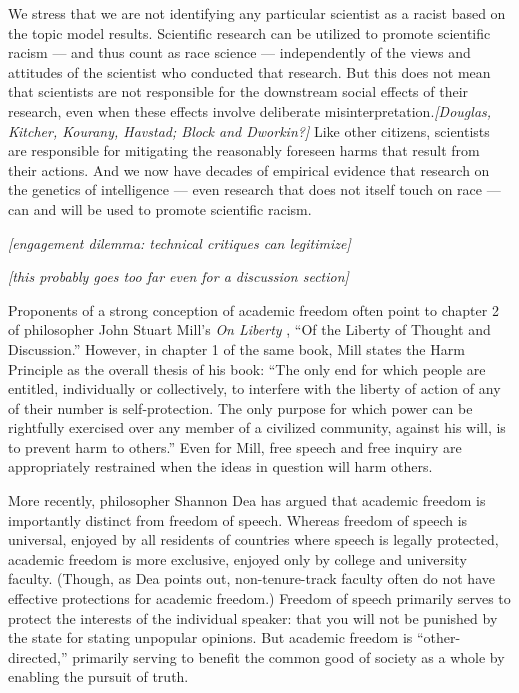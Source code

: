 \documentclass[12pt]{article}
\begin{document}
We stress that we are not identifying any particular scientist as a
racist based on the topic model results. Scientific research can be
utilized to promote scientific racism --- and thus count as race science
--- independently of the views and attitudes of the scientist who
conducted that
research.\cite{TaberyWhyStudyingGenetics2015, CarlsonQuantifyingContextualizingImpact2020, HennWhyDNANo2021}
But this does not mean that scientists are not responsible for the
downstream social effects of their research, even when these effects
involve deliberate misinterpretation.\emph{{[}Douglas, Kitcher, Kourany,
Havstad; Block and Dworkin?{]}} Like other citizens, scientists are
responsible for mitigating the reasonably foreseen harms that result
from their actions. And we now have decades of empirical evidence that
research on the genetics of intelligence --- even research that does not
itself touch on race --- can and will be used to promote scientific
racism.\cite{MeyerWrestlingSocialBehavioral2023}

\emph{{[}engagement dilemma: technical critiques can legitimize{]}}

\emph{{[}this probably goes too far even for a discussion section{]}}

Proponents of a strong conception of academic freedom often point to
chapter 2 of philosopher John Stuart Mill's \emph{On Liberty}
\cite{MillLiberty1862}, ``Of the Liberty of Thought and Discussion.''
However, in chapter 1 of the same book, Mill states the Harm Principle
as the overall thesis of his book: ``The only end for which people are
entitled, individually or collectively, to interfere with the liberty of
action of any of their number is self-protection. The only purpose for
which power can be rightfully exercised over any member of a civilized
community, against his will, is to prevent harm to others.'' Even for
Mill, free speech and free inquiry are appropriately restrained when the
ideas in question will harm others.

More recently, philosopher Shannon Dea
\cite{DeaEvolvingSocialPurpose2021} has argued that academic freedom is
importantly distinct from freedom of speech. Whereas freedom of speech
is universal, enjoyed by all residents of countries where speech is
legally protected, academic freedom is more exclusive, enjoyed only by
college and university faculty. (Though, as Dea points out,
non-tenure-track faculty often do not have effective protections for
academic freedom.) Freedom of speech primarily serves to protect the
interests of the individual speaker: that you will not be punished by
the state for stating unpopular opinions. But academic freedom is
``other-directed,'' primarily serving to benefit the common good of
society as a whole by enabling the pursuit of truth.
\end{document}
